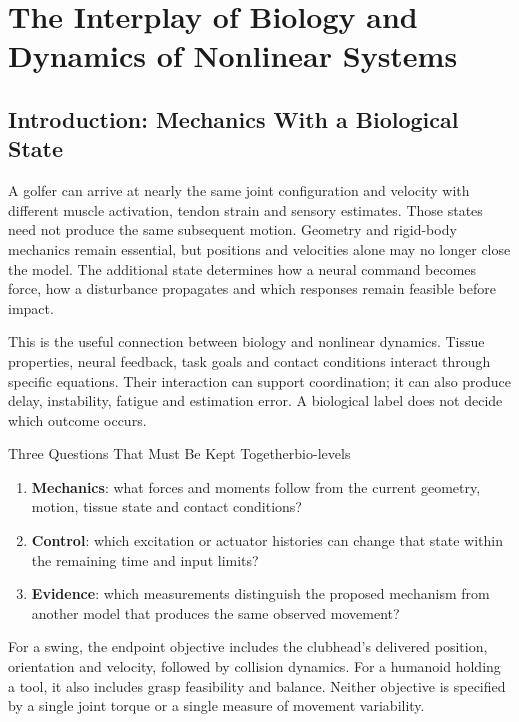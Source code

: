 \chapter[Biology and Nonlinear Dynamics]{The Interplay of Biology and\\Dynamics of Nonlinear Systems}
\label{ch:biology-nonlinear}

\section{Introduction: Mechanics With a Biological State}

A golfer can arrive at nearly the same joint configuration and velocity with
different muscle activation, tendon strain and sensory estimates. Those states
need not produce the same subsequent motion. Geometry and rigid-body mechanics
remain essential, but positions and velocities alone may no longer close the
model. The additional state determines how a neural command becomes force, how
a disturbance propagates and which responses remain feasible before impact.

This is the useful connection between biology and nonlinear dynamics. Tissue
properties, neural feedback, task goals and contact conditions interact through
specific equations. Their interaction can support coordination; it can also
produce delay, instability, fatigue and estimation error. A biological label
does not decide which outcome occurs.

\begin{insight}[colframe=chapblue]{Three Questions That Must Be Kept Together}{bio-levels}
\begin{enumerate}
\item \textbf{Mechanics}: what forces and moments follow from the current
geometry, motion, tissue state and contact conditions?
\item \textbf{Control}: which excitation or actuator histories can change that
state within the remaining time and input limits?
\item \textbf{Evidence}: which measurements distinguish the proposed mechanism
from another model that produces the same observed movement?
\end{enumerate}
For a swing, the endpoint objective includes the clubhead's delivered position,
orientation and velocity, followed by collision dynamics. For a humanoid holding
a tool, it also includes grasp feasibility and balance. Neither objective is
specified by a single joint torque or a single measure of movement variability.
\end{insight}

